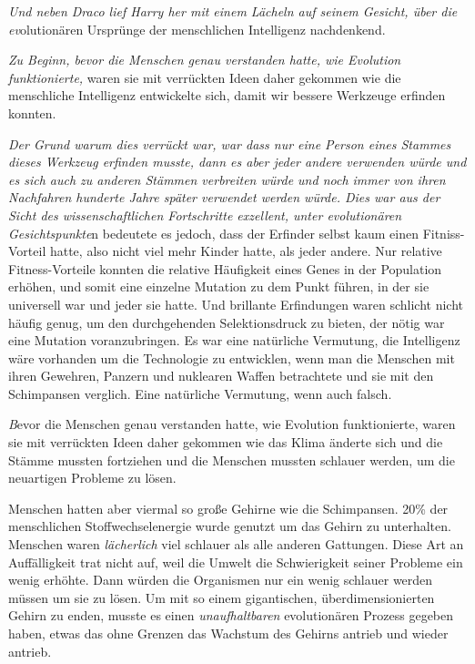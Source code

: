 {\emph{Und neben Draco lief Harry her mit einem Lächeln auf seinem Gesicht, über die ev}olutionären Ursprünge der menschlichen Intelligenz nachdenkend.

\emph{Zu Beginn, bevor die Menschen genau verstanden hatte, wie Evolution funktionierte,} waren sie mit verrückten Ideen daher gekommen wie die menschliche Intelligenz entwickelte sich, damit wir bessere Werkzeuge erfinden konnten.

\emph{Der Grund warum dies verrückt war, war dass nur eine Person eines Stammes dieses Werkzeug erfinden musste, dann es aber jeder andere verwenden würde und es sich auch zu anderen Stämmen verbreiten würde und noch immer von ihren Nachfahren hunderte Jahre später verwendet werden würde. Dies war aus der Sicht des wissenschaftlichen Fortschritte exzellent, unter evolutionären Gesichtspunkte}n bedeutete es jedoch, dass der Erfinder selbst kaum einen Fitniss-Vorteil hatte, also nicht viel mehr Kinder hatte, als jeder andere. Nur relative Fitness-Vorteile konnten die relative Häufigkeit eines Genes in der Population erhöhen, und somit eine einzelne Mutation zu dem Punkt führen, in der sie universell war und jeder sie hatte. Und brillante Erfindungen waren schlicht nicht häufig genug, um den durchgehenden Selektionsdruck zu bieten, der nötig war eine Mutation voranzubringen. Es war eine natürliche Vermutung, die Intelligenz wäre vorhanden um die Technologie zu entwicklen, wenn man die Menschen mit ihren Gewehren, Panzern und nuklearen Waffen betrachtete und sie mit den Schimpansen verglich. Eine natürliche Vermutung, wenn auch falsch.

\emph{B}evor die Menschen genau verstanden hatte, wie Evolution funktionierte, waren sie mit verrückten Ideen daher gekommen wie das Klima änderte sich und die Stämme mussten fortziehen und die Menschen mussten schlauer werden, um die neuartigen Probleme zu lösen.

Menschen hatten aber viermal so große Gehirne wie die Schimpansen. 20\% der menschlichen Stoffwechselenergie wurde genutzt um das Gehirn zu unterhalten. Menschen waren \emph{lächerlich} viel schlauer als alle anderen Gattungen. Diese Art an Auffälligkeit trat nicht auf, weil die Umwelt die Schwierigkeit seiner Probleme ein wenig erhöhte. Dann würden die Organismen nur ein wenig schlauer werden müssen um sie zu lösen. Um mit so einem gigantischen, überdimensionierten Gehirn zu enden, musste es einen \emph{unaufhaltbaren} evolutionären Prozess gegeben haben, etwas das ohne Grenzen das Wachstum des Gehirns antrieb und wieder antrieb.

}
